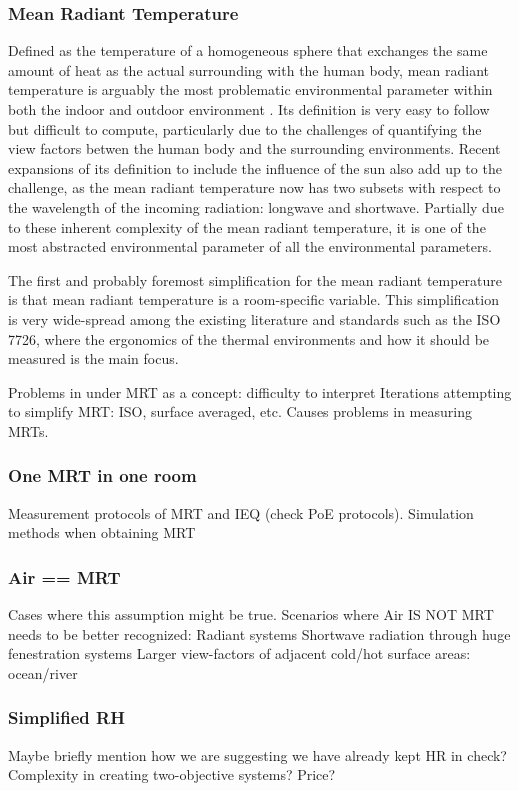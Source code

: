 \subsubsection{Mean Radiant Temperature}
    Defined as the temperature of a homogeneous sphere that exchanges the same amount of heat as the actual surrounding with the human body, mean radiant temperature is arguably the most problematic environmental parameter within both the indoor and outdoor environment \cite{kantor_most_2011}. Its definition is very easy to follow but difficult to compute, particularly due to the challenges of quantifying the view factors betwen the human body and the surrounding environments.
    Recent expansions of its definition to include the influence of the sun also add up to the challenge, as the mean radiant temperature now has two subsets with respect to the wavelength of the incoming radiation: longwave and shortwave\cite{ansi/ashrae_standard_2017}. Partially due to these inherent complexity of the mean radiant temperature, it is one of the most abstracted environmental parameter of all the environmental parameters.

    The first and probably foremost simplification for the mean radiant temperature is that mean radiant temperature is a room-specific variable. This simplification is very wide-spread among the existing literature and standards such as the ISO 7726\cite{standardization_iso7726_2001}, where the ergonomics of the thermal environments and how it should be measured is the main focus.  

            Problems in under MRT as a concept: difficulty to interpret Iterations attempting to simplify MRT: ISO, surface averaged, etc. Causes problems in measuring MRTs.
\subsubsection{One MRT in one room}
            Measurement protocols of MRT and IEQ (check PoE protocols).
            Simulation methods when obtaining MRT
\subsubsection{Air == MRT}
            Cases where this assumption might be true.
            Scenarios where Air IS NOT MRT needs to be better recognized:
            Radiant systems
            Shortwave radiation through huge fenestration systems
            Larger view-factors of adjacent cold/hot surface areas: ocean/river
\subsubsection{Simplified RH}
            Maybe briefly mention how we are suggesting we have already kept HR in check?
            Complexity in creating two-objective systems? Price?
